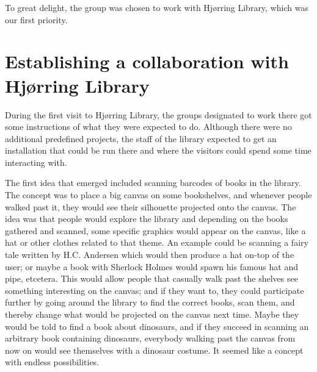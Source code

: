 To great delight, the group was chosen to work with Hj{\o}rring Library, which was our first priority.

\section{Establishing a collaboration with Hj{\o}rring Library}


During the first visit to Hj{\o}rring Library, the groups designated to work there got some instructions of what they were expected to do. Although there were no additional predefined projects, the staff of the library expected to get an installation that could be run there and where the visitors could spend some time interacting with.

The first idea that emerged included scanning barcodes of books in the library. The concept was to place a big canvas on some bookshelves, and whenever people walked past it, they would see their silhouette projected onto the canvas. The idea was that people would explore the library and depending on the books gathered and scanned, some specific graphics would appear on the canvas, like a hat or other clothes related to that theme. An example could be scanning a fairy tale written by H.C. Andersen which would then produce a hat on-top of the user; or maybe a book with Sherlock Holmes would spawn his famous hat and pipe, etcetera. This would allow people that casually walk past the shelves see something interesting on the canvas; and if they want to, they could participate further by going around the library to find the correct books, scan them, and thereby change what would be projected on the canvas next time. Maybe they would be told to find a book about dinosaurs, and if they succeed in scanning an arbitrary book containing dinosaurs, everybody walking past the canvas from now on would see themselves with a dinosaur costume. It seemed like a concept with endless possibilities.

